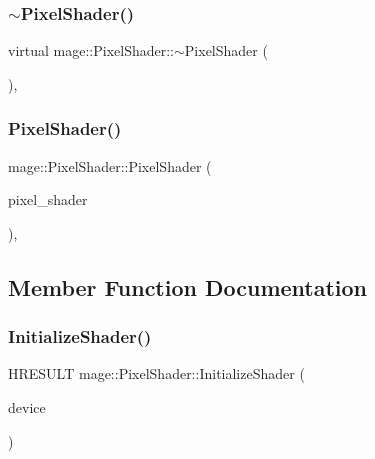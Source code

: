 \subsubsection{\texorpdfstring{$\sim$\+Pixel\+Shader()}{~PixelShader()}}
{\footnotesize\ttfamily virtual mage\+::\+Pixel\+Shader\+::$\sim$\+Pixel\+Shader (\begin{DoxyParamCaption}{ }\end{DoxyParamCaption})\hspace{0.3cm}{\ttfamily [virtual]}, {\ttfamily [default]}}

\hypertarget{classmage_1_1_pixel_shader_a361df943e40e9015ac4b769af130ce79}{}\label{classmage_1_1_pixel_shader_a361df943e40e9015ac4b769af130ce79} 
\subsubsection{\texorpdfstring{Pixel\+Shader()}{PixelShader()}\hspace{0.1cm}{\footnotesize\ttfamily [2/2]}}
{\footnotesize\ttfamily mage\+::\+Pixel\+Shader\+::\+Pixel\+Shader (\begin{DoxyParamCaption}\item[{const \hyperlink{classmage_1_1_pixel_shader}{Pixel\+Shader} \&}]{pixel\+\_\+shader }\end{DoxyParamCaption})\hspace{0.3cm}{\ttfamily [private]}, {\ttfamily [delete]}}



\subsection{Member Function Documentation}
\hypertarget{classmage_1_1_pixel_shader_a8a16c2b5d25427fdb5675b1b2be4cbfd}{}\label{classmage_1_1_pixel_shader_a8a16c2b5d25427fdb5675b1b2be4cbfd} 
\subsubsection{\texorpdfstring{Initialize\+Shader()}{InitializeShader()}}
{\footnotesize\ttfamily H\+R\+E\+S\+U\+LT mage\+::\+Pixel\+Shader\+::\+Initialize\+Shader (\begin{DoxyParamCaption}\item[{const \hyperlink{classmage_1_1_rendering_device}{Rendering\+Device} \&}]{device }\end{DoxyParamCaption})\hspace{0.3cm}{\ttfamily [private]}}

